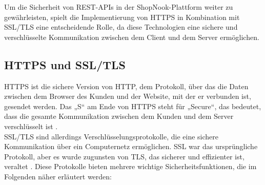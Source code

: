 Um die Sicherheit von REST-APIs in der ShopNook-Plattform weiter zu gewährleisten, spielt die Implementierung von HTTPS in Kombination mit SSL/TLS eine entscheidende Rolle, da diese Technologien eine sichere und verschlüsselte Kommunikation zwischen dem Client und dem Server ermöglichen.

\subsection{HTTPS und SSL/TLS}

HTTPS ist die sichere Version von HTTP, dem Protokoll, über das die Daten zwischen dem Browser des Kunden und der Website, mit der er verbunden ist, gesendet werden. Das „S“ am Ende von HTTPS steht für „Secure“, das bedeutet, dass die gesamte Kommunikation zwischen dem Kunden und dem Server verschlüsselt ist \cite{HTTPS:2024}.\\
SSL/TLS sind allerdings Verschlüsselungsprotokolle, die eine sichere Kommunikation über ein Computernetz ermöglichen. SSL war das ursprüngliche Protokoll, aber es wurde zugunsten von TLS, das sicherer und effizienter ist, veraltet \cite{SSL/TLS:2023}. Diese Protokolle bieten mehrere wichtige Sicherheitsfunktionen, die im Folgenden näher erläutert werden:

